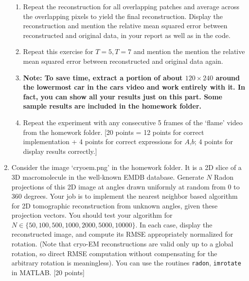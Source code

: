 \documentclass[11pt]{article}
\begin{document}
\begin{enumerate}
\begin{enumerate}
\item Repeat the reconstruction for all overlapping patches and average across the overlapping pixels to yield the final reconstruction. Display the reconstruction and mention the relative mean squared error between reconstructed and original data, in your report as well as in the code. 
\item Repeat this exercise for $T = 5, T = 7$ and mention the mention the relative mean squared error between reconstructed and original data again.
\item \textbf{Note: To save time, extract a portion of about $120 \times 240$ around the lowermost car in the cars video and work entirely with it. In fact, you can show all your results just on this part. Some sample results are included in the homework folder.}
\item Repeat the experiment with any consecutive 5 frames of the `flame' video from the homework folder. 
\textsf{[20 points = 12 points for correct implementation + 4 points for correct expressions for $A$,$b$; 4 points for display results correctly.]}
\end{enumerate}

\item Consider the image `cryoem.png' in the homework folder. It is a 2D slice of a 3D macromolecule in the well-known EMDB database. Generate $N$ Radon projections of this 2D image at angles drawn uniformly at random from $0$ to $360$ degrees. Your job is to implement the nearest neighbor based algorithm for 2D tomographic reconstruction from unknown angles, given these projection vectors. You should test your algorithm for $N \in \{50,100,500,1000,2000,5000,10000\}$. In each case, display the reconstructed image, and compute its RMSE appropriately normalized for rotation. (Note that cryo-EM reconstructions are valid only up to a global rotation, so direct RMSE computation without compensating for the arbitrary rotation is meaningless). You can use the routines \texttt{radon}, \texttt{imrotate} in MATLAB. \textsf{[20 points]}  

\end{enumerate}
\end{document}
